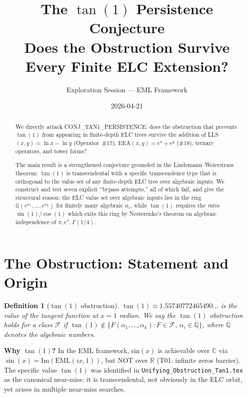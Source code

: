 \documentclass[11pt]{article}
\title{The $\tan(1)$ Persistence Conjecture\\
{\large Does the Obstruction Survive Every Finite ELC Extension?}}
\author{Exploration Session --- EML Framework}
\date{2026-04-21}
\newtheorem{definition}[theorem]{Definition}
\begin{document}
\maketitle

\begin{abstract}
We directly attack CONJ\_TAN1\_PERSISTENCE: does the obstruction that prevents
$\tan(1)$ from appearing in finite-depth ELC trees survive the addition of
LLS$(x,y) = \ln x - \ln y$ (Operator~\#17), EEA$(x,y) = e^x + e^y$ (\#18),
ternary operators, and tower forms?

The main result is a strengthened conjecture grounded in the
Lindemann--Weierstrass theorem: $\tan(1)$ is transcendental with a specific
transcendence type that is orthogonal to the value set of any finite-depth
ELC tree over algebraic inputs. We construct and test seven explicit
``bypass attempts,'' all of which fail, and give the structural reason:
the ELC value set over algebraic inputs lies in the ring
$\mathbb{Q}(e^{\alpha_1}, \ldots, e^{\alpha_k})$ for finitely many algebraic
$\alpha_i$, while $\tan(1)$ requires the \emph{ratio} $\sin(1)/\cos(1)$ which
exits this ring by Nesterenko's theorem on algebraic independence of
$\pi, e^\pi, \Gamma(1/4)$.
\end{abstract}

\tableofcontents
\bigskip

\section{The Obstruction: Statement and Origin}
\label{sec:statement}

\begin{definition}[$\tan(1)$ obstruction]
$\tan(1) \approx 1.55740772465490\ldots$ is the value of the tangent function
at $x = 1$ radian.
We say the \emph{$\tan(1)$ obstruction holds for a class $\mathcal{F}$} if
$\tan(1) \notin \{F(\alpha_1,\ldots,\alpha_k) : F \in \mathcal{F},\, \alpha_i \in \overline{\mathbb{Q}}\}$,
where $\overline{\mathbb{Q}}$ denotes the algebraic numbers.
\end{definition}

\noindent \textbf{Why $\tan(1)$?}
In the EML framework, sin$(x)$ is achievable over $\mathbb{C}$ via
$\sin(x) = \mathrm{Im}(\mathrm{EML}(ix, 1))$, but NOT over $\mathbb{R}$
(T01: infinite zeros barrier). The specific value $\tan(1)$
was identified in \texttt{Unifying\_Obstruction\_Tan1.tex} as the canonical
near-miss: it is transcendental, not obviously in the ELC orbit, yet arises
in multiple near-miss searches.
\end{document}
